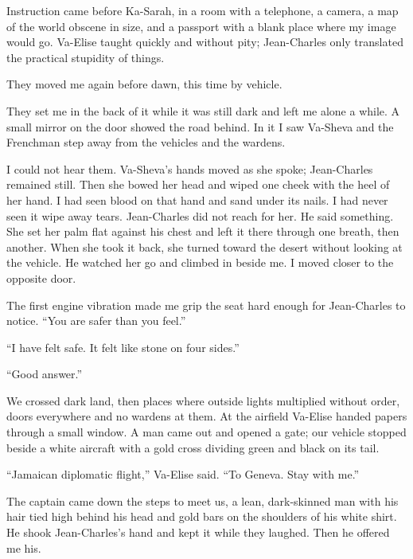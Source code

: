 \ornament

Instruction came before Ka-Sarah, in a room with a telephone, a camera, a map of the world obscene in size, and a passport with a blank place where my image would go. Va-Elise taught quickly and without pity; Jean-Charles only translated the practical stupidity of things.\par

They moved me again before dawn, this time by vehicle.\par

They set me in the back of it while it was still dark and left me alone a while. A small mirror on the door showed the road behind. In it I saw Va-Sheva and the Frenchman step away from the vehicles and the wardens.\par

I could not hear them. Va-Sheva's hands moved as she spoke; Jean-Charles remained still. Then she bowed her head and wiped one cheek with the heel of her hand. I had seen blood on that hand and sand under its nails. I had never seen it wipe away tears. Jean-Charles did not reach for her. He said something. She set her palm flat against his chest and left it there through one breath, then another. When she took it back, she turned toward the desert without looking at the vehicle. He watched her go and climbed in beside me. I moved closer to the opposite door.\par

The first engine vibration made me grip the seat hard enough for Jean-Charles to notice. ``You are safer than you feel.''\par

``I have felt safe. It felt like stone on four sides.''\par

``Good answer.''\par

We crossed dark land, then places where outside lights multiplied without order, doors everywhere and no wardens at them. At the airfield Va-Elise handed papers through a small window. A man came out and opened a gate; our vehicle stopped beside a white aircraft with a gold cross dividing green and black on its tail.\par

``Jamaican diplomatic flight,'' Va-Elise said. ``To Geneva. Stay with me.''\par

The captain came down the steps to meet us, a lean, dark-skinned man with his hair tied high behind his head and gold bars on the shoulders of his white shirt. He shook Jean-Charles's hand and kept it while they laughed. Then he offered me his.\par

